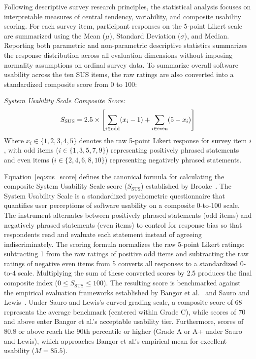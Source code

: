     Following descriptive survey research principles, the statistical analysis focuses on interpretable measures of central tendency, variability, and composite usability scoring. For each survey item, participant responses on the 5-point Likert scale are summarized using the Mean ($\mu$), Standard Deviation ($\sigma$), and Median. Reporting both parametric and non-parametric descriptive statistics summarizes the response distribution across all evaluation dimensions without imposing normality assumptions on ordinal survey data. To summarize overall software usability across the ten SUS items, the raw ratings are also converted into a standardized composite score from 0 to 100:

    \noindent\textit{System Usability Scale Composite Score:}
    \begin{equation}
        S_{\text{SUS}} = 2.5 \times \left[ \sum_{i \in \text{odd}} (x_i - 1) + \sum_{i \in \text{even}} (5 - x_i) \right]
        \label{eq:sus_score}
        \eqcaption{System Usability Scale Composite Score}
    \end{equation}
    \noindent Where $x_i \in \{1, 2, 3, 4, 5\}$ denotes the raw 5-point Likert response for survey item $i$, with odd items ($i \in \{1, 3, 5, 7, 9\}$) representing positively phrased statements and even items ($i \in \{2, 4, 6, 8, 10\}$) representing negatively phrased statements.

    Equation~\ref{eq:sus_score} defines the canonical formula for calculating the composite System Usability Scale score ($S_{\text{SUS}}$) established by Brooke~\cite{brooke1996sus}. The System Usability Scale is a standardized psychometric questionnaire that quantifies user perceptions of software usability on a composite 0-to-100 scale. The instrument alternates between positively phrased statements (odd items) and negatively phrased statements (even items) to control for response bias so that respondents read and evaluate each statement instead of agreeing indiscriminately. The scoring formula normalizes the raw 5-point Likert ratings: subtracting 1 from the raw ratings of positive odd items and subtracting the raw ratings of negative even items from 5 converts all responses to a standardized 0-to-4 scale. Multiplying the sum of these converted scores by 2.5 produces the final composite index ($0 \le S_{\text{SUS}} \le 100$). The resulting score is benchmarked against the empirical evaluation frameworks established by Bangor et al.~\cite{bangor2008empirical, bangor2009determining} and Sauro and Lewis~\cite{sauro2012quantifying}. Under Sauro and Lewis's curved grading scale, a composite score of 68 represents the average benchmark (centered within Grade C), while scores of 70 and above enter Bangor et al.'s acceptable usability tier. Furthermore, scores of 80.8 or above reach the 90th percentile or higher (Grade A or A+ under Sauro and Lewis), which approaches Bangor et al.'s empirical mean for excellent usability ($M = 85.5$).

